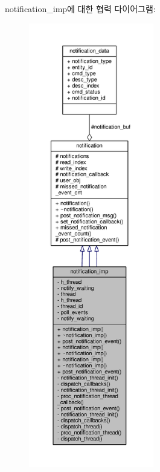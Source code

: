 notification\+\_\+imp에 대한 협력 다이어그램\+:
\nopagebreak
\begin{figure}[H]
\begin{center}
\leavevmode
\includegraphics[height=550pt]{classavdecc__lib_1_1notification__imp__coll__graph}
\end{center}
\end{figure}
